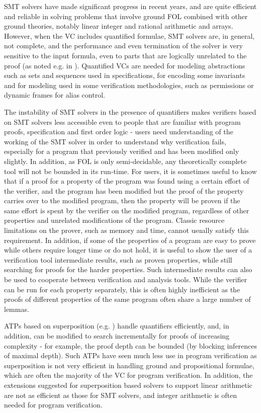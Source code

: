 SMT solvers have made significant progress in recent years, and are quite efficient and reliable in solving problems that involve ground FOL combined with other ground theories, notably linear integer and rational arithmetic and arrays. However, when the VC includes quantified formulae, SMT solvers are, in general, not complete, and the performance and even termination of the solver is very sensitive to the input formula, even to parts that are logically unrelated to the proof (as noted e.g. in \cite{LeinoP16}).
Quantified VCs are needed for modeling abstractions such as sets and sequences used in specifications, for encoding some invariants and for modeling used in some verification methodologies, such as permissions or dynamic frames for alias control.

The instability of SMT solvers in the presence of quantifiers makes verifiers based on SMT solvers less accessible even to people that are familiar with program proofs, specification and first order logic - users need understanding of the working of the SMT solver in order to understand why verification fails, especially for a program that previously verified and has been modified only slightly. 
In addition, as FOL is only semi-decidable, any theoretically complete tool will not be bounded in its run-time.
For users, it is sometimes useful to know that if a proof for a property of the program was found using a certain effort of the verifier, and the program has been modified but the proof of the property carries over to the modified program, then the property will be proven if the same effort is spent by the verifier on the modified program, regardless of other properties and unrelated modifications of the program. Classic resource limitations on the prover, such as memory and time, cannot usually satisfy this requirement.
In addition, if some of the properties of a program are easy to prove while others require longer time or do not hold, it is useful to show the user of a verification tool intermediate results, such as proven properties, while still searching for proofs for the harder properties. Such intermediate results can also be used to cooperate between verification and analysis tools. While the verifier can be run for each property separately, this is often highly inefficient as the proofs of different properties of the same program often share a large number of lemmas.

ATPs based on superposition (e.g. \cite{DBLP:conf/cade/RiazanovV99}) handle quantifiers efficiently, 
and, in addition, can be modified to search incrementally for proofs of increasing complexity - for example, the proof depth can be bounded (by blocking inferences of maximal depth). Such ATPs have seen much less use in program verification as superposition is not very efficient in handling ground and propositional formulae, which are often the majority of the VC for program verification. In addition, the extensions suggested for superposition based solvers to support linear arithmetic are not as efficient as those for SMT solvers, and integer arithmetic is often needed for program verification.

